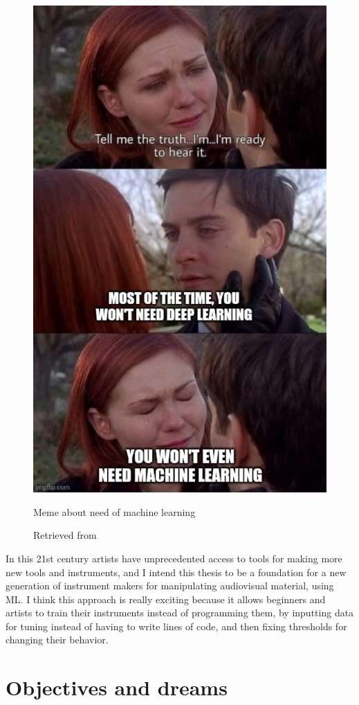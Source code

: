 \begin{figure}[ht]
  \centering
  \includegraphics[width=0.75\linewidth,height=0.50\textheight,keepaspectratio]{images/meme-spider-man.jpg}
  \caption{Meme about need of machine learning}
  \caption*{Retrieved from \cite{website-twitter-dynamicwebpaige-meme}}
  \label{fig:meme-spider-man}
\end{figure}

In this 21st century artists have unprecedented access to tools for making more new tools and instruments, and I intend this thesis to be a foundation for a new generation of instrument makers for manipulating audiovisual material, using \acrshort{ML}. I think this approach is really exciting because it allows beginners and artists to train their instruments instead of programming them, by inputting data for tuning instead of having to write lines of code, and then fixing thresholds for changing their behavior.

\section{Objectives and dreams}


